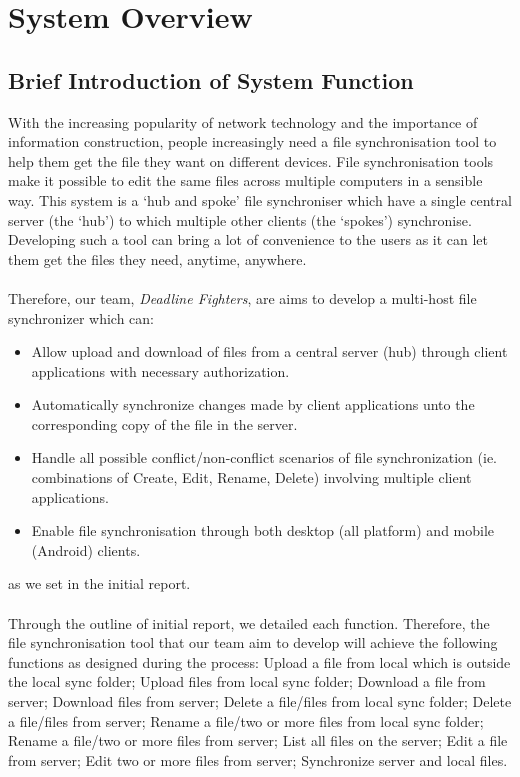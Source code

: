 \section{System Overview}
\subsection{Brief Introduction of System Function}
With the increasing popularity of network technology and the importance of information construction, people increasingly need a file synchronisation tool to help them get the file they want on different devices. File synchronisation tools make it possible to edit the same files across multiple computers in a sensible way. This system is a ‘hub and spoke’ file synchroniser which have a single central server (the ‘hub’) to which multiple other clients (the ‘spokes’) synchronise. Developing such a tool can bring a lot of convenience to the users as it can let them get the files they need, anytime, anywhere.\\\\
Therefore, our team, \emph{Deadline Fighters}, are aims to develop a multi-host file synchronizer which can:
\begin{itemize}
\item{Allow upload and download of files from a central server (hub) through client applications with necessary authorization.}
\item{Automatically synchronize changes made by client applications unto the corresponding copy of the file in the server.}
\item{Handle all possible conflict/non-conflict scenarios of file synchronization (ie. combinations of Create, Edit, Rename, Delete) involving multiple client applications.}
\item{Enable file synchronisation through both desktop (all platform) and mobile (Android) clients.}
\end{itemize}
as we set in the initial report.\\\\
Through the outline of initial report, we detailed each function. Therefore, the file synchronisation tool that our team aim to develop will achieve the following functions as designed during the process: Upload a file from local which is outside the local sync folder; Upload files from local sync folder; Download a file from server; Download files from server; Delete a file/files from local sync folder; Delete a file/files from server; Rename a file/two or more files from local sync folder; Rename a file/two or more files from server; List all files on the server; Edit a file from server; Edit two or more files from server; Synchronize server and local files.\\\
